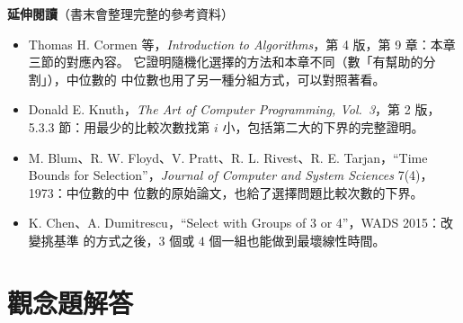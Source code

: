 \textbf{延伸閱讀}（書末會整理完整的參考資料）

\begin{itemize}
\item Thomas H. Cormen 等，\textit{Introduction to Algorithms}，第 4 版，第 9 章：本章
三節的對應內容。 它證明隨機化選擇的方法和本章不同（數「有幫助的分割」），中位數的
中位數也用了另一種分組方式，可以對照著看。
\item Donald E. Knuth，\textit{The Art of Computer Programming, Vol.~3}，第 2 版，
5.3.3 節：用最少的比較次數找第 $i$ 小，包括第二大的下界的完整證明。
\item M. Blum、R. W. Floyd、V. Pratt、R. L. Rivest、R. E. Tarjan，``Time Bounds for
Selection''，\textit{Journal of Computer and System Sciences} 7(4)，1973：中位數的中
位數的原始論文，也給了選擇問題比較次數的下界。
\item K. Chen、A. Dumitrescu，``Select with Groups of 3 or 4''，WADS 2015：改變挑基準
的方式之後，$3$ 個或 $4$ 個一組也能做到最壞線性時間。
\end{itemize}

\section*{觀念題解答}

